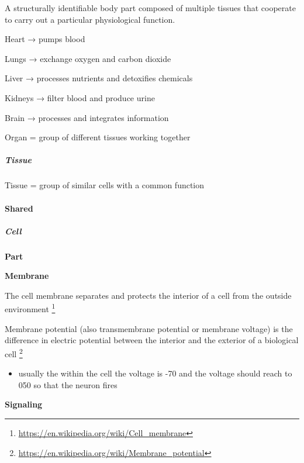 \documentclass{book}
\providecommand{\ProjectDeepHeading}[2]{%
    \par\medskip\noindent\textbf{#2}\par\smallskip
}
\providecommand{\seeherefooter}[1]{\footnote{\url{#1}}}
\begin{document}
    A structurally identifiable body part composed of multiple tissues that cooperate to carry out a particular physiological function.
    
    Heart → pumps blood

    Lungs → exchange oxygen and carbon dioxide
    
    Liver → processes nutrients and detoxifies chemicals
    
    Kidneys → filter blood and produce urine
    
    Brain → processes and integrates information
    
    Organ = group of different tissues working together

\subparagraph{Tissue}


Tissue = group of similar cells with a common function

\paragraph{Shared}

\subparagraph{Cell}

\ProjectDeepHeading{1}{Part}

\ProjectDeepHeading{2}{Membrane}


The cell membrane separates and protects the interior of a cell from the outside environment
    \seeherefooter{https://en.wikipedia.org/wiki/Cell_membrane}


Membrane potential (also transmembrane potential or membrane voltage) is the difference in electric potential between the interior and the exterior of a biological cell \seeherefooter{https://en.wikipedia.org/wiki/Membrane_potential}
    
    \begin{itemize}
        \item usually the within the cell the voltage is -70 and the voltage should reach to 050 so that the neuron fires
    \end{itemize}

\ProjectDeepHeading{2}{Signaling}

\end{document}
